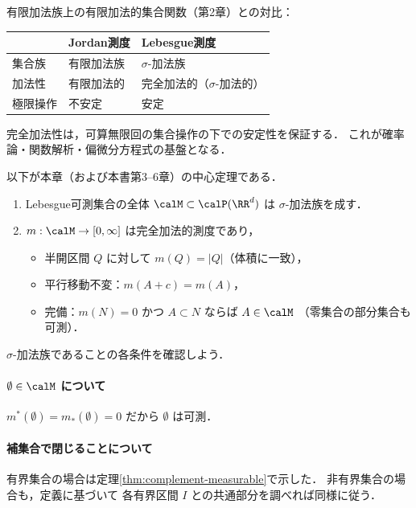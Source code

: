 \begin{remark}
有限加法族上の有限加法的集合関数（第2章）との対比：
\begin{center}
\begin{tabular}{l|l|l}
 & Jordan測度 & Lebesgue測度 \\
\hline
集合族 & 有限加法族 & $\sigma$-加法族 \\
加法性 & 有限加法的 & 完全加法的（$\sigma$-加法的） \\
極限操作 & 不安定 & 安定
\end{tabular}
\end{center}
完全加法性は，可算無限回の集合操作の下での安定性を保証する．
これが確率論・関数解析・偏微分方程式の基盤となる．
\end{remark}

以下が本章（および本書第3--6章）の中心定理である．

\begin{theorem}[Lebesgue測度の基本定理]\label{thm:lebesgue-main}
\begin{enumerate}
\item Lebesgue可測集合の全体 $\calM \subset \calP(\RR^d)$ は
$\sigma$-加法族を成す．
\item $m : \calM \to [0,\infty]$ は完全加法的測度であり，
\begin{itemize}
\item 半開区間 $Q$ に対して $m(Q) = |Q|$（体積に一致），
\item 平行移動不変：$m(A+c) = m(A)$，
\item 完備：$m(N) = 0$ かつ $A \subset N$ ならば $A \in \calM$
（零集合の部分集合も可測）．
\end{itemize}
\end{enumerate}
\end{theorem}

$\sigma$-加法族であることの各条件を確認しよう．

\paragraph{$\emptyset \in \calM$ について}
$m^*(\emptyset) = m_*(\emptyset) = 0$ だから $\emptyset$ は可測．

\paragraph{補集合で閉じることについて}
有界集合の場合は定理\ref{thm:complement-measurable}で示した．
非有界集合の場合も，定義に基づいて
各有界区間 $I$ との共通部分を調べれば同様に従う．

